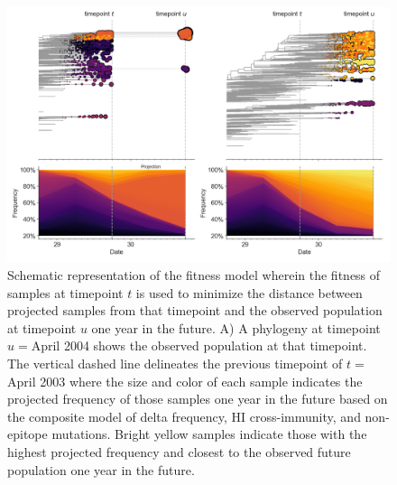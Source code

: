 \begin{figure}[t]
  \begin{center}
  \includegraphics[width=\columnwidth]{figures/distance-based-fitness-model.png}
  \caption{
    Schematic representation of the fitness model wherein the fitness of samples at timepoint $t$ is used to minimize the distance between projected samples from that timepoint and the observed population at timepoint $u$ one year in the future.
    A) A phylogeny at timepoint $u=$April 2004 shows the observed population at that timepoint.
    The vertical dashed line delineates the previous timepoint of $t=$April 2003 where the size and color of each sample indicates the projected frequency of those samples one year in the future based on the composite model of delta frequency, HI cross-immunity, and non-epitope mutations.
    Bright yellow samples indicate those with the highest projected frequency and closest to the observed future population one year in the future.
  }
  \label{fig:model}
  \end{center}
\end{figure}

